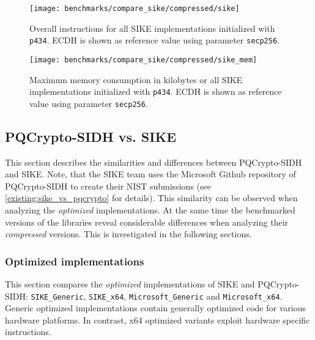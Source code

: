 \begin{figure}[H]
  \centering
  \texttt{[image: benchmarks/compare\_sike/compressed/sike]}
  \caption[Overall instructions \gls{SIKE}]
  {Overall instructions for all \gls{SIKE} implementations initialized with \texttt{p434}. \gls{ECDH} is shown as reference value using parameter \texttt{secp256}.}
  \label{fig:results_sike}
\end{figure}

\begin{figure}[H]
  \centering
  \texttt{[image: benchmarks/compare\_sike/compressed/sike\_mem]}
  \caption[Maximum memory consumption \gls{SIKE}]
  {Maximum memory consumption in kilobytes or all \gls{SIKE} implementations initialized with \texttt{p434}. \gls{ECDH} is shown as reference value using parameter \texttt{secp256}.}
  \label{fig:results_sike_mem}
\end{figure}

\subsection{\gls{PQCrypto-SIDH} vs. \gls{SIKE}}

This section describes the similarities and differences between \gls{PQCrypto-SIDH} and \gls{SIKE}. Note, that the \gls{SIKE} team uses the Microsoft Github repository of \gls{PQCrypto-SIDH} to create their \gls{NIST} submissions (see \autoref{existing:sike_vs_pqcrypto} for details). This similarity can be observed when analyzing the \textit{optimized} implementations. At the same time the benchmarked versions of the libraries reveal considerable differences when analyzing their \textit{compressed} versions. This is investigated in the following sections.

\subsubsection{Optimized implementations}
This section compares the \textit{optimized} implementations of \gls{SIKE} and \gls{PQCrypto-SIDH}: \texttt{SIKE\_Generic}, \texttt{SIKE\_x64}, \texttt{Microsoft\_Generic} and  \texttt{Microsoft\_x64}.
Generic optimized implementations contain generally optimized code for various hardware platforms. In contrast, x64 optimized variants exploit hardware specific instructions. 

